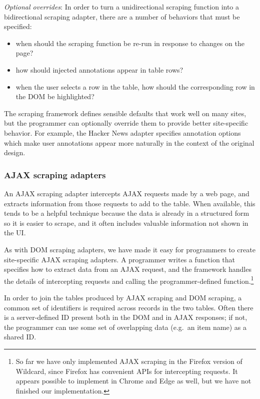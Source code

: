 \documentclass[sigplan,screen,10pt,anonymous,review]{acmart}
\providecommand{\tightlist}{%
  \setlength{\itemsep}{0pt}\setlength{\parskip}{0pt}}
\begin{document}
\emph{Optional overrides}: In order to turn a unidirectional scraping
function into a bidirectional scraping adapter, there are a number of
behaviors that must be specified:

\begin{itemize}
\tightlist
\item
  when should the scraping function be re-run in response to changes on
  the page?
\item
  how should injected annotations appear in table rows?
\item
  when the user selects a row in the table, how should the corresponding
  row in the DOM be highlighted?
\end{itemize}

The scraping framework defines sensible defaults that work well on many
sites, but the programmer can optionally override them to provide better
site-specific behavior. For example, the Hacker News adapter specifies
annotation options which make user annotations appear more naturally in
the context of the original design.

\hypertarget{ajax-scraping-adapters}{%
\subsubsection{AJAX scraping adapters}\label{ajax-scraping-adapters}}

An AJAX scraping adapter intercepts AJAX requests made by a web page,
and extracts information from those requests to add to the table. When
available, this tends to be a helpful technique because the data is
already in a structured form so it is easier to scrape, and it often
includes valuable information not shown in the UI.

As with DOM scraping adapters, we have made it easy for programmers to
create site-specific AJAX scraping adapters. A programmer writes a
function that specifies how to extract data from an AJAX request, and
the framework handles the details of intercepting requests and calling
the programmer-defined function.\footnote{So far we have only
  implemented AJAX scraping in the Firefox version of Wildcard, since
  Firefox has convenient APIs for intercepting requests. It appears
  possible to implement in Chrome and Edge as well, but we have not
  finished our implementation.}

In order to join the tables produced by AJAX scraping and DOM scraping,
a common set of identifiers is required across records in the two
tables. Often there is a server-defined ID present both in the DOM and
in AJAX responses; if not, the programmer can use some set of
overlapping data (e.g.~an item name) as a shared ID.
\end{document}
